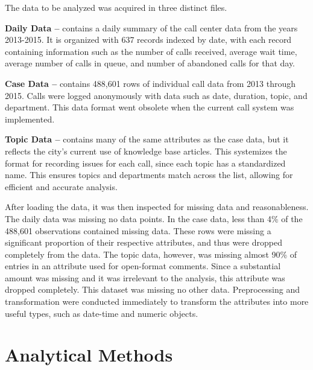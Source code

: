\documentclass{article}
\begin{document}
The data to be analyzed was acquired in three distinct files.
\par
\textbf{Daily Data --} contains a daily summary of the call center data from the years 2013-2015.  It is organized with 637 records indexed by date, with each record containing information such as the number of calls received, average wait time, average number of calls in queue, and number of abandoned calls for that day.
\par
\textbf{Case Data --} contains 488,601 rows of individual call data from 2013 through 2015.  Calls were logged anonymously with data such as date, duration, topic, and department.  This data format went obsolete when the current call system was implemented.
\par
\textbf{Topic Data --} contains many of the same attributes as the case data, but it reflects the city's current use of knowledge base articles.  This systemizes the format for recording issues for each call, since each topic has a standardized name.  This ensures topics and departments match across the list, allowing for efficient and accurate analysis.
\par
After loading the data, it was then inspected for missing data and reasonableness.  The daily data was missing no data points.  In the case data, less than 4\% of the 488,601 observations contained missing data.  These rows were missing a significant proportion of their respective attributes, and thus were dropped completely from the data.  The topic data, however, was missing almost 90\% of entries in an attribute used for open-format comments.  Since a substantial amount was missing and it was irrelevant to the analysis, this attribute was dropped completely.  This dataset was missing no other data.  Preprocessing and transformation were conducted immediately to transform the attributes into more useful types, such as date-time and numeric objects.

\section{Analytical Methods}
\end{document}
